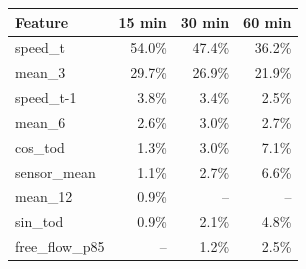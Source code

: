 \begin{tabular}{@{}lrrr@{}}
\toprule
Feature & 15 min & 30 min & 60 min \\
\midrule
speed\_t & 54.0\% & 47.4\% & 36.2\% \\
mean\_3 & 29.7\% & 26.9\% & 21.9\% \\
speed\_t-1 & 3.8\% & 3.4\% & 2.5\% \\
mean\_6 & 2.6\% & 3.0\% & 2.7\% \\
cos\_tod & 1.3\% & 3.0\% & 7.1\% \\
sensor\_mean & 1.1\% & 2.7\% & 6.6\% \\
mean\_12 & 0.9\% & -- & -- \\
sin\_tod & 0.9\% & 2.1\% & 4.8\% \\
free\_flow\_p85 & -- & 1.2\% & 2.5\% \\
\bottomrule
\end{tabular}

